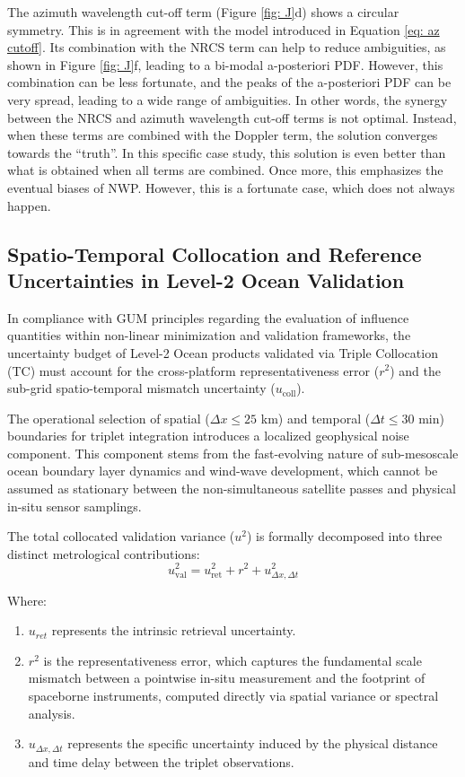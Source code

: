 The azimuth wavelength cut-off term (Figure \ref{fig: J}d) shows a circular
symmetry. This is in agreement with the model introduced in Equation \ref{eq:
az cutoff}. Its combination with the \ac{NRCS} term can help to reduce
ambiguities, as shown in Figure \ref{fig: J}f, leading to a bi-modal
a-posteriori \ac{PDF}. However, this combination can be less fortunate, and the
peaks of the a-posteriori \ac{PDF} can be very spread, leading to a wide range
of ambiguities. In other words, the synergy between the \ac{NRCS} and azimuth
wavelength cut-off terms is not optimal. Instead, when these terms are combined
with the Doppler term, the solution converges towards the ``truth''. In this
specific case study, this solution is even better than what is obtained when
all terms are combined. Once more, this emphasizes the eventual biases of
\ac{NWP}. However, this is a fortunate case, which does not always happen. 

\subsection{Spatio-Temporal Collocation and Reference Uncertainties in Level-2 Ocean Validation}
\label{sec: spt errors}

In compliance with GUM principles regarding the evaluation of influence quantities within non-linear minimization and validation frameworks, the uncertainty budget of Level-2 Ocean products validated via Triple Collocation (TC) must account for the cross-platform representativeness error ($r^{2}$) and the sub-grid spatio-temporal mismatch uncertainty ($u_{\text{coll}}$). 

The operational selection of spatial ($\Delta x \le 25$ km) and temporal ($\Delta t \le 30$ min) boundaries for triplet integration introduces a localized geophysical noise component. This component stems from the fast-evolving nature of sub-mesoscale ocean boundary layer dynamics and wind-wave development, which cannot be assumed as stationary between the non-simultaneous satellite passes and physical in-situ sensor samplings.

The total collocated validation variance ($u^2$) is formally decomposed into three distinct metrological contributions:
\begin{equation}
u_{\text{val}}^2 = u_{\text{ret}}^2 + r^2 + u^{2}_{\Delta x, \Delta t}
\end{equation}

Where:
\begin{enumerate}
\item  $u_{ret}$ represents the intrinsic retrieval uncertainty.
\item  $r^{2}$ is the representativeness error, which captures the fundamental scale mismatch between a pointwise in-situ measurement and the footprint of spaceborne instruments, computed directly via spatial variance or spectral analysis.
\item  $u_{\Delta x, \Delta t}$ represents the specific uncertainty induced by the physical distance and time delay between the triplet observations.
\end{enumerate}

